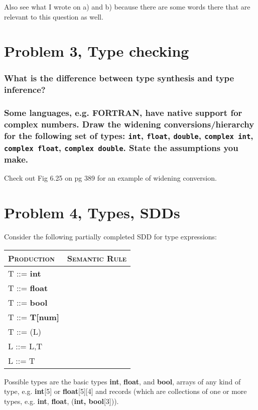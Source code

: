 Also see what I wrote on a) and b) because there are some words there that are relevant to this question as well.

\newpage
\setcounter{subsubsection}{0}
\section{Problem 3, Type checking}
\subsubsection{What is the difference between type synthesis and type inference?}

\subsubsection{Some languages, e.g. FORTRAN, have native support for complex numbers. Draw the widening conversions/hierarchy for the following set of types: \texttt{int}, \texttt{float}, \texttt{double}, \texttt{complex int}, \texttt{complex float}, \texttt{complex double}. State the assumptions you make.}

Check out Fig 6.25 on pg 389 for an example of widening conversion.

\newpage
\setcounter{subsubsection}{0}
\section{Problem 4, Types, SDDs}
Consider the following partially completed SDD for type expressions:
\begin{table}[H]
\begin{tabular}{ll}
	\textsc{Production} & \textsc{Semantic Rule} \\ \hline
	T ::= \textbf{int}	&						\\
	T ::= \textbf{float}& \\
	T ::= \textbf{bool} & \\
	T ::= \textbf{T[num]}& \\
	T ::= (L) 			& \\
	L ::= L,T			& \\
	L ::= T				& \\
\end{tabular}
\end{table}

Possible types are the basic types \textbf{int}, \textbf{float}, and \textbf{bool}, arrays of any kind of type, e.g. \textbf{int}[5] or \textbf{float}[5][4] and records (which are collections of one or more types, e.g. \textbf{int}, \textbf{float}, (\textbf{int, bool}[3])).

